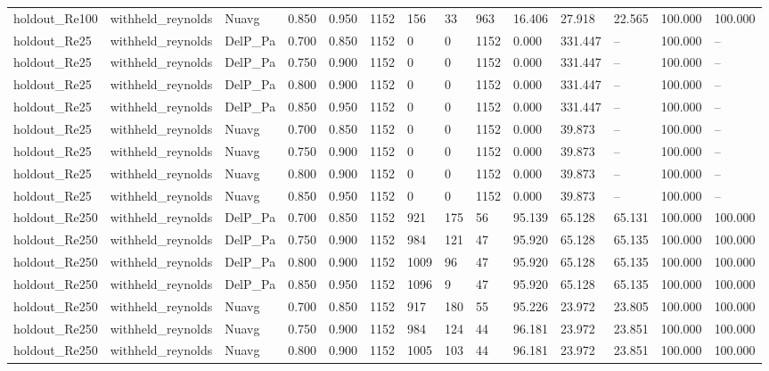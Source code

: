\begin{tabular}{llllllllllllll}
holdout_Re100 & withheld_reynolds & Nuavg & 0.850 & 0.950 & 1152 & 156 & 33 & 963 & 16.406 & 27.918 & 22.565 & 100.000 & 100.000 \\
holdout_Re25 & withheld_reynolds & DelP_Pa & 0.700 & 0.850 & 1152 & 0 & 0 & 1152 & 0.000 & 331.447 & -- & 100.000 & -- \\
holdout_Re25 & withheld_reynolds & DelP_Pa & 0.750 & 0.900 & 1152 & 0 & 0 & 1152 & 0.000 & 331.447 & -- & 100.000 & -- \\
holdout_Re25 & withheld_reynolds & DelP_Pa & 0.800 & 0.900 & 1152 & 0 & 0 & 1152 & 0.000 & 331.447 & -- & 100.000 & -- \\
holdout_Re25 & withheld_reynolds & DelP_Pa & 0.850 & 0.950 & 1152 & 0 & 0 & 1152 & 0.000 & 331.447 & -- & 100.000 & -- \\
holdout_Re25 & withheld_reynolds & Nuavg & 0.700 & 0.850 & 1152 & 0 & 0 & 1152 & 0.000 & 39.873 & -- & 100.000 & -- \\
holdout_Re25 & withheld_reynolds & Nuavg & 0.750 & 0.900 & 1152 & 0 & 0 & 1152 & 0.000 & 39.873 & -- & 100.000 & -- \\
holdout_Re25 & withheld_reynolds & Nuavg & 0.800 & 0.900 & 1152 & 0 & 0 & 1152 & 0.000 & 39.873 & -- & 100.000 & -- \\
holdout_Re25 & withheld_reynolds & Nuavg & 0.850 & 0.950 & 1152 & 0 & 0 & 1152 & 0.000 & 39.873 & -- & 100.000 & -- \\
holdout_Re250 & withheld_reynolds & DelP_Pa & 0.700 & 0.850 & 1152 & 921 & 175 & 56 & 95.139 & 65.128 & 65.131 & 100.000 & 100.000 \\
holdout_Re250 & withheld_reynolds & DelP_Pa & 0.750 & 0.900 & 1152 & 984 & 121 & 47 & 95.920 & 65.128 & 65.135 & 100.000 & 100.000 \\
holdout_Re250 & withheld_reynolds & DelP_Pa & 0.800 & 0.900 & 1152 & 1009 & 96 & 47 & 95.920 & 65.128 & 65.135 & 100.000 & 100.000 \\
holdout_Re250 & withheld_reynolds & DelP_Pa & 0.850 & 0.950 & 1152 & 1096 & 9 & 47 & 95.920 & 65.128 & 65.135 & 100.000 & 100.000 \\
holdout_Re250 & withheld_reynolds & Nuavg & 0.700 & 0.850 & 1152 & 917 & 180 & 55 & 95.226 & 23.972 & 23.805 & 100.000 & 100.000 \\
holdout_Re250 & withheld_reynolds & Nuavg & 0.750 & 0.900 & 1152 & 984 & 124 & 44 & 96.181 & 23.972 & 23.851 & 100.000 & 100.000 \\
holdout_Re250 & withheld_reynolds & Nuavg & 0.800 & 0.900 & 1152 & 1005 & 103 & 44 & 96.181 & 23.972 & 23.851 & 100.000 & 100.000 \\

\end{tabular}
